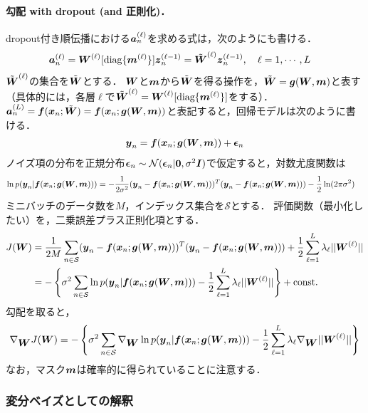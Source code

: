 \paragraph{勾配 with dropout (and 正則化)．}
dropout付き順伝播における$\va^{(\ell)}_n$を求める式は，次のようにも書ける．
\begin{align*}
 \va^{(\ell)}_n
 &= \vW^{(\ell)}[\mbox{diag}\{\vm^{(\ell)}\}]\vz^{(\ell-1)}_n
 = \tilde{\vW}^{(\ell)}\vz^{(\ell-1)}_n,~~~\ell=1,\cdots,L
\end{align*}
$\tilde{\vW}^{(\ell)}$の集合を$\tilde{\vW}$とする．
$\vW$と$\vm$から$\tilde{\vW}$を得る操作を，$\tilde{\vW}=\vg(\vW,\vm)$と表す（具体的には，各層$\ell$で$\tilde{\vW}^{(\ell)}=\vW^{(\ell)}[\mbox{diag}\{\vm^{(\ell)}\}]$をする）．
$\va^{(L)}_n=\vf(\vx_n;\tilde{\vW})=\vf(\vx_n;\vg(\vW,\vm))$と表記すると，回帰モデルは次のように書ける．
\begin{align*}
\vy_n=\vf(\vx_n;\vg(\vW,\vm))+\vepsilon_n
\end{align*}
ノイズ項の分布を正規分布$\vepsilon_n\sim\mathcal{N}(\vepsilon_n|\0,\sigma^2\vI)$で仮定すると，対数尤度関数は
\begin{align*}
\ln p(\vy_n|\vf(\vx_n;\vg(\vW,\vm))) &= -\frac{1}{2\sigma^2}(\vy_{n}-\vf(\vx_n;\vg(\vW,\vm)))^T(\vy_{n}-\vf(\vx_n;\vg(\vW,\vm))) - \frac{1}{2}\ln(2\pi\sigma^2)
\end{align*}
ミニバッチのデータ数を$M$，インデックス集合を$\mathcal{S}$とする．
評価関数（最小化したい）を，二乗誤差プラス正則化項とする．
\begin{align*}
J(\vW)
&= \frac{1}{2M}\sum_{n\in\mathcal{S}}(\vy_{n}-\vf(\vx_n;\vg(\vW,\vm)))^T(\vy_{n}-\vf(\vx_n;\vg(\vW,\vm))) + \frac{1}{2}\sum_{\ell=1}^{L}\lambda_{\ell}||\vW^{(\ell)}||
\\
&= -\left\{ \sigma^2\sum_{n\in\mathcal{S}}\ln p(\vy_n|\vf(\vx_n;\vg(\vW,\vm))) - \frac{1}{2}\sum_{\ell=1}^{L}\lambda_{\ell}||\vW^{(\ell)}|| \right\} + \mbox{const.}
\end{align*}
勾配を取ると，
\begin{align*}
\nabla_{\vW} J(\vW)
= -\left\{ \sigma^2\sum_{n\in\mathcal{S}} \nabla_{\vW}\ln p(\vy_n|\vf(\vx_n;\vg(\vW,\vm))) - \frac{1}{2}\sum_{\ell=1}^{L}\lambda_{\ell}\nabla_{\vW}||\vW^{(\ell)}|| \right\}
\end{align*}
なお，マスク$\vm$は確率的に得られていることに注意する．

\subsubsection{変分ベイズとしての解釈\cite{gal2016dropout}}

